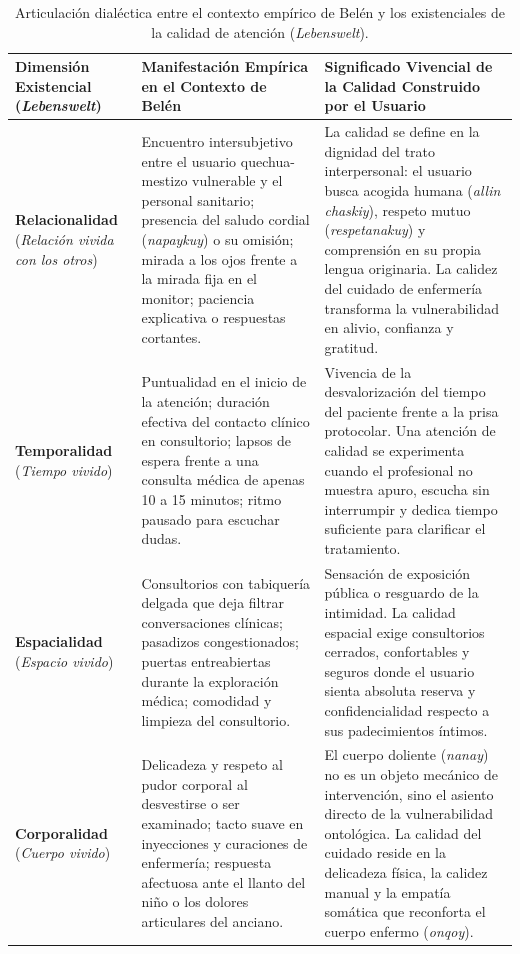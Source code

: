 \begin{table}[H]
\centering
\small
\caption{Articulación dialéctica entre el contexto empírico de Belén y los existenciales de la calidad de atención (\textit{Lebenswelt}).}
\label{tab:articulacion_existenciales}
\vspace{0.2cm}
\begin{tabularx}{\textwidth}{p{3.2cm}p{4.8cm}X}
\toprule
\textbf{Dimensión Existencial (\textit{Lebenswelt})} & \textbf{Manifestación Empírica en el Contexto de Belén} & \textbf{Significado Vivencial de la Calidad Construido por el Usuario} \\
\midrule
\textbf{Relacionalidad} \newline (\textit{Relación vivida con los otros}) & 
Encuentro intersubjetivo entre el usuario quechua-mestizo vulnerable y el personal sanitario; presencia del saludo cordial (\textit{napaykuy}) o su omisión; mirada a los ojos frente a la mirada fija en el monitor; paciencia explicativa o respuestas cortantes. & 
La calidad se define en la dignidad del trato interpersonal: el usuario busca acogida humana (\textit{allin chaskiy}), respeto mutuo (\textit{respetanakuy}) y comprensión en su propia lengua originaria. La calidez del cuidado de enfermería transforma la vulnerabilidad en alivio, confianza y gratitud. \\
\addlinespace
\textbf{Temporalidad} \newline (\textit{Tiempo vivido}) & 
Puntualidad en el inicio de la atención; duración efectiva del contacto clínico en consultorio; lapsos de espera frente a una consulta médica de apenas 10 a 15 minutos; ritmo pausado para escuchar dudas. & 
Vivencia de la desvalorización del tiempo del paciente frente a la prisa protocolar. Una atención de calidad se experimenta cuando el profesional no muestra apuro, escucha sin interrumpir y dedica tiempo suficiente para clarificar el tratamiento. \\
\addlinespace
\textbf{Espacialidad} \newline (\textit{Espacio vivido}) & 
Consultorios con tabiquería delgada que deja filtrar conversaciones clínicas; pasadizos congestionados; puertas entreabiertas durante la exploración médica; comodidad y limpieza del consultorio. & 
Sensación de exposición pública o resguardo de la intimidad. La calidad espacial exige consultorios cerrados, confortables y seguros donde el usuario sienta absoluta reserva y confidencialidad respecto a sus padecimientos íntimos. \\
\addlinespace
\textbf{Corporalidad} \newline (\textit{Cuerpo vivido}) & 
Delicadeza y respeto al pudor corporal al desvestirse o ser examinado; tacto suave en inyecciones y curaciones de enfermería; respuesta afectuosa ante el llanto del niño o los dolores articulares del anciano. & 
El cuerpo doliente (\textit{nanay}) no es un objeto mecánico de intervención, sino el asiento directo de la vulnerabilidad ontológica. La calidad del cuidado reside en la delicadeza física, la calidez manual y la empatía somática que reconforta el cuerpo enfermo (\textit{onqoy}). \\
\bottomrule
\end{tabularx}
\end{table}

